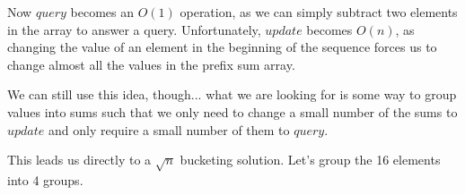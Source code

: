 \documentclass[11pt]{book}
\begin{document}
\begin{center}

\end{center}

Now $query$ becomes an $O(1)$ operation, as we can simply subtract two elements in the array to answer a query. Unfortunately, $update$ becomes $O(n)$, as changing the value of an element in the beginning of the sequence forces us to change almost all the values in the prefix sum array.

We can still use this idea, though... what we are looking for is some way to group values into sums such that we only need to change a small number of the sums to $update$ and only require a small number of them to $query$.

This leads us directly to a $\sqrt{n}$ bucketing solution. Let's group the 16 elements into 4 groups.
\end{document}
